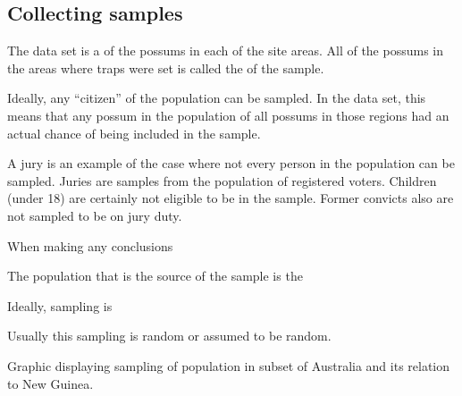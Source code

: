 \subsection{Collecting samples}

The  data set is a  of the possums in each of the site areas. All of the possums in the areas where traps were set is called the  of the sample.

Ideally, any ``citizen'' of the population can be sampled. In the  data set, this means that any possum in the population of all possums in those regions had an actual chance of being included in the sample.

A jury is an example of the case where not every person in the population can be sampled. Juries are samples from the population of registered voters. Children (under 18) are certainly not eligible to be in the sample. Former convicts also are not sampled to be on jury duty.

When making any conclusions

The population that is the source of the sample is the 


Ideally, sampling is 

Usually this sampling is random or assumed to be random.


\begin{center}
\vspace{0.5cm}

Graphic displaying sampling of population in subset of Australia and its relation to New Guinea.

\vspace{0.5cm}
\end{center}

